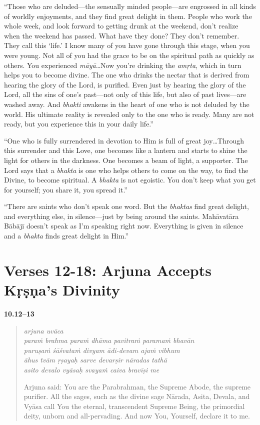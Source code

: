 \enquote{Those who are deluded---the sensually minded people---are engrossed in all kinds of worldly enjoyments, and they find great delight in them. People who work the whole week, and look forward to getting drunk at the weekend, don’t realize when the weekend has passed. What have they done? They don’t remember. They call this \enquote{life.} I know many of you have gone through this stage, when you were young. Not all of you had the grace to be on the spiritual path as quickly as others. You experienced \textit{māyā}\ldots Now you’re drinking the \textit{amṛta}, which in turn helps you to become divine. The one who drinks the nectar that is derived from hearing the glory of the Lord, is purified. Even just by hearing the glory of the Lord, all the sins of one’s past---not only of this life, but also of past lives---are washed away. And \textit{bhakti} awakens in the heart of one who is not deluded by the world. His ultimate reality is revealed only to the one who is ready. Many are not ready, but you experience this in your daily life.}

\enquote{One who is fully surrendered in devotion to Him is full of great joy\ldots Through this surrender and this Love, one becomes like a lantern and starts to shine the light for others in the darkness. One becomes a beam of light, a supporter. The Lord says that a \textit{bhakta} is one who helps others to come on the way, to find the Divine, to become spiritual. A \textit{bhakta} is not egoistic. You don’t keep what you get for yourself; you share it, you spread it.}

\enquote{There are saints who don’t speak one word. But the \textit{bhaktas} find great delight, and everything else, in silence---just by being around the saints. Mahāvatāra Bābājī doesn’t speak as I’m speaking right now. Everything is given in silence and a \textit{bhakta} finds great delight in Him.}

\newpage
\section{Verses 12-18: Arjuna Accepts Kṛṣṇa's Divinity}\label{sec-verses-12-18-arjuna-accepts-krsna-s-divinity}


\par\noindent\textbf{10.12–13}\par
\begin{verse}
\textit{arjuna uvāca} \\
\textit{paraṁ brahma paraṁ dhāma pavitraṁ paramaṁ bhavān} \\
\textit{puruṣaṁ śāśvataṁ divyam ādi-devam ajaṁ vibhum} \\
\textit{āhus tvām ṛṣayaḥ sarve devarṣir nāradas tathā} \\
\textit{asito devalo vyāsaḥ svayaṁ caiva bravīṣi me}

\noindent Arjuna said: You are the Parabrahman, the Supreme Abode, the supreme purifier. All the sages, such as the divine sage Nārada, Asita, Devala, and Vyāsa call You the eternal, transcendent Supreme Being, the primordial deity, unborn and all-pervading. And now You, Yourself, declare it to me.
\end{verse}
\par



